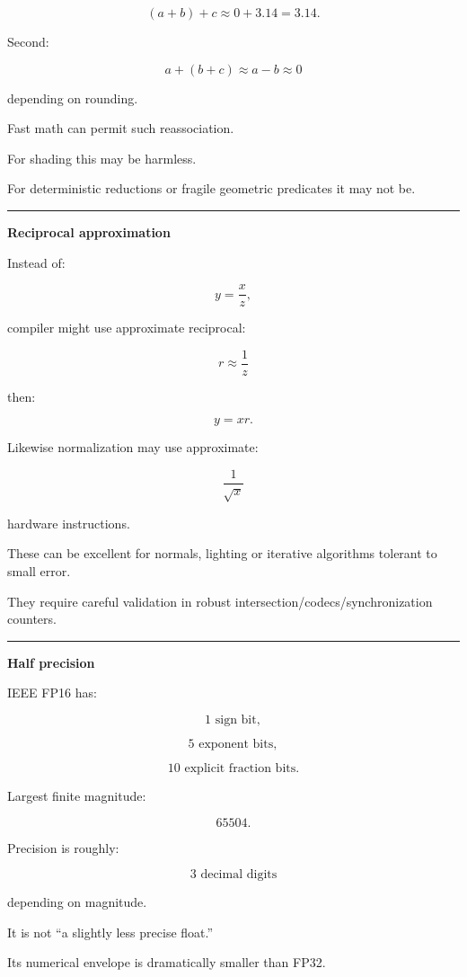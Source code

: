 \[
(a+b)+c
\approx
0+3.14
=
3.14.
\]

Second:

\[
a+(b+c)
\approx
a-b
\approx0
\]

depending on rounding.

Fast math can permit such reassociation.

For shading this may be harmless.

For deterministic reductions or fragile geometric predicates it may not be.

\begin{center}\rule{0.5\linewidth}{0.5pt}\end{center}

\textbf{Reciprocal approximation}

Instead of:

\[
y=\frac{x}{z},
\]

compiler might use approximate reciprocal:

\[
r\approx\frac1z
\]

then:

\[
y=xr.
\]

Likewise normalization may use approximate:

\[
\frac1{\sqrt{x}}
\]

hardware instructions.

These can be excellent for normals, lighting or iterative algorithms tolerant to small error.

They require careful validation in robust intersection/codecs/synchronization counters.

\begin{center}\rule{0.5\linewidth}{0.5pt}\end{center}

\textbf{Half precision}

IEEE FP16 has:

\[
1\text{ sign bit},
\]

\[
5\text{ exponent bits},
\]

\[
10\text{ explicit fraction bits}.
\]

Largest finite magnitude:

\[
65504.
\]

Precision is roughly:

\[
3\text{ decimal digits}
\]

depending on magnitude.

It is not ``a slightly less precise float.''

Its numerical envelope is dramatically smaller than FP32.

